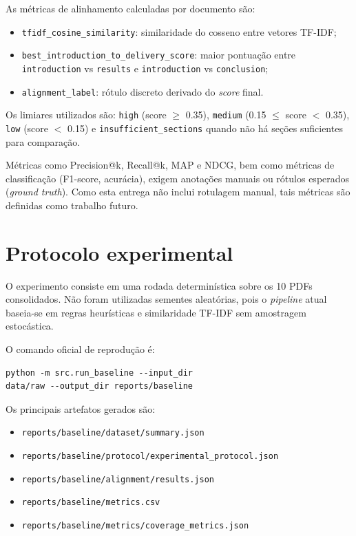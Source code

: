\documentclass[12pt]{article}
\begin{document}
As métricas de alinhamento calculadas por documento são:

\begin{itemize}
    \item \texttt{tfidf\_cosine\_similarity}: similaridade do cosseno entre vetores TF-IDF;
    \item \texttt{best\_introduction\_to\_delivery\_score}: maior pontuação entre \texttt{introduction} vs \texttt{results} e \texttt{introduction} vs \texttt{conclusion};
    \item \texttt{alignment\_label}: rótulo discreto derivado do \textit{score} final.
\end{itemize}

Os limiares utilizados são: \texttt{high} (score $\ge$ 0.35), \texttt{medium} (0.15 $\le$ score $<$ 0.35), \texttt{low} (score $<$ 0.15) e \texttt{insufficient\_sections} quando não há seções suficientes para comparação.

Métricas como Precision@k, Recall@k, MAP e NDCG, bem como métricas de classificação (F1-score, acurácia), exigem anotações manuais ou rótulos esperados (\textit{ground truth}). Como esta entrega não inclui rotulagem manual, tais métricas são definidas como trabalho futuro.

\section{Protocolo experimental}

O experimento consiste em uma rodada determinística sobre os 10 PDFs consolidados. Não foram utilizadas sementes aleatórias, pois o \textit{pipeline} atual baseia-se em regras heurísticas e similaridade TF-IDF sem amostragem estocástica.

O comando oficial de reprodução é:

\begin{verbatim}
python -m src.run_baseline --input_dir 
data/raw --output_dir reports/baseline
\end{verbatim}

Os principais artefatos gerados são:

\begin{itemize}
    \item \texttt{reports/baseline/dataset/summary.json}
    \item \texttt{reports/baseline/protocol/experimental\_protocol.json}
    \item \texttt{reports/baseline/alignment/results.json}
    \item \texttt{reports/baseline/metrics.csv}
    \item \texttt{reports/baseline/metrics/coverage\_metrics.json}
\end{itemize}
\end{document}
